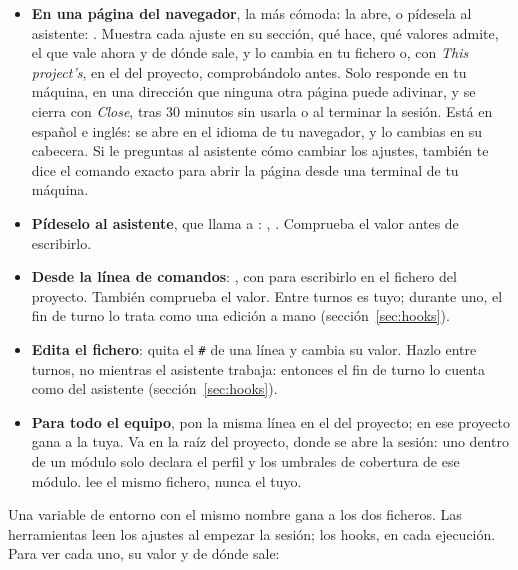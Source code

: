 \documentclass[11pt,a4paper]{article}
\begin{document}
\begin{itemize}
  \item \textbf{En una página del navegador}, la más cómoda:
        \allowbreak{}
        la abre, o pídesela al asistente: . Muestra cada ajuste en su sección, qué hace, qué valores
        admite, el que vale ahora y de dónde sale, y lo cambia en tu fichero o,
        con \emph{This project's}, en el del proyecto, comprobándolo antes.
        Solo responde en tu máquina, en una dirección que ninguna otra página
        puede adivinar, y se cierra con \emph{Close}, tras 30 minutos sin usarla
        o al terminar la sesión. Está en español e inglés: se abre en el idioma
        de tu navegador, y lo cambias en su cabecera. Si le preguntas al
        asistente cómo cambiar los
        ajustes, también te dice el comando exacto para abrir la página desde
        una terminal de tu máquina.
  \item \textbf{Pídeselo al asistente}, que llama a :
        , . Comprueba el valor antes de escribirlo.
  \item \textbf{Desde la línea de comandos}:
        ,
        con  para escribirlo en el fichero del proyecto. También comprueba el valor.
        Entre turnos es tuyo; durante uno, el fin de turno lo trata como una
        edición a mano (sección~\ref{sec:hooks}).
  \item \textbf{Edita el fichero}: quita el \texttt{\#} de una línea y cambia su valor.
        Hazlo entre turnos, no mientras el asistente trabaja: entonces el fin
        de turno lo cuenta como del asistente (sección~\ref{sec:hooks}).
  \item \textbf{Para todo el equipo}, pon la misma línea en el
         del proyecto; en ese proyecto gana a la tuya.
        Va en la raíz del proyecto, donde se abre la sesión: uno dentro de un
        módulo solo declara el perfil y los umbrales de cobertura de ese
        módulo.  lee el mismo fichero, nunca el tuyo.
\end{itemize}

Una variable de entorno con el mismo nombre gana a los dos ficheros. Las
herramientas leen los ajustes al empezar la sesión; los hooks, en cada
ejecución. Para ver cada uno, su valor y de dónde sale:
\end{document}
